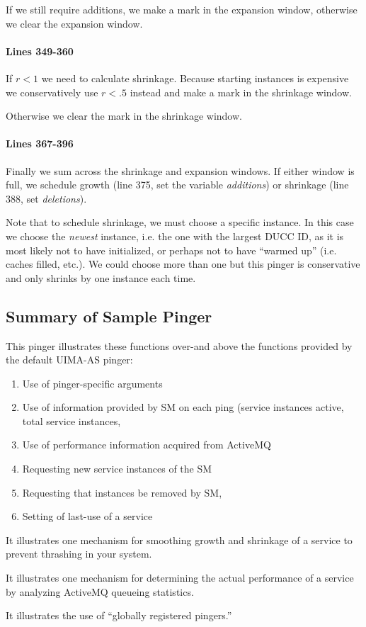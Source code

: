   If we still require additions, we make a mark in the expansion window, 
   otherwise we clear the expansion window.

   \paragraph{Lines 349-360}
   If $r < 1$ we need to calculate shrinkage.  Because starting instances
   is expensive we conservatively use $r < .5$ instead and make a mark
   in the shrinkage window.  

   Otherwise we clear the mark in the shrinkage window.

   \paragraph{Lines 367-396}
   Finally we sum across the shrinkage and expansion windows.  If either
   window is full, we schedule growth (line 375, set the variable {\em additions})
   or shrinkage (line 388, set {\em deletions}).

   Note that to schedule shrinkage, we must choose a specific instance.  In this
   case we choose the {\em newest} instance, i.e. the one with the largest
   DUCC ID, as it is most likely not to have initialized, or perhaps not to
   have ``warmed up'' (i.e. caches filled, etc.).  We could choose more than
   one but this pinger is conservative and only shrinks by one instance
   each time.

   \subsection{Summary of Sample Pinger}
   This pinger illustrates these functions over-and above the functions provided
   by the default UIMA-AS pinger:
   \begin{enumerate}
     \item Use of pinger-specific arguments
     \item Use of information provided by SM on each ping (service instances
       active, total service instances,
     \item Use of performance information acquired from ActiveMQ
     \item Requesting new service instances of the SM
     \item Requesting that instances be removed by SM,
     \item Setting of last-use of a service
   \end{enumerate}

   It illustrates one mechanism for smoothing growth and shrinkage of a service
   to prevent thrashing in your system.

   It illustrates one mechanism for determining the actual performance of
   a service by analyzing ActiveMQ queueing statistics.
     
   It illustrates the use of ``globally registered pingers.''
